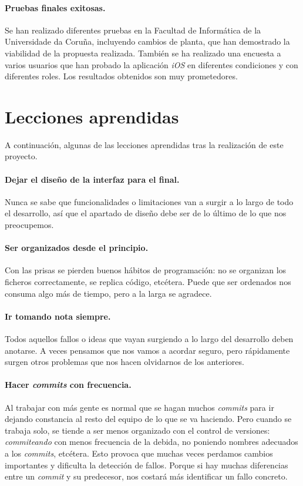 \paragraph{Pruebas finales exitosas.} Se han realizado diferentes pruebas en la Facultad de Informática de la Universidade da Coruña, incluyendo cambios de planta, que han demostrado la viabilidad de la propuesta realizada.
También se ha realizado una encuesta a varios usuarios que han probado la aplicación \emph{iOS} en diferentes condiciones y con diferentes roles. Los resultados obtenidos son muy prometedores.



\section{Lecciones aprendidas}
A continuación, algunas de las lecciones aprendidas tras la realización de este proyecto.

\paragraph{Dejar el diseño de la interfaz para el final.}
Nunca se sabe que funcionalidades o limitaciones van a surgir a lo largo de todo el desarrollo, así que el apartado de diseño debe ser de lo último de lo que nos preocupemos.

\paragraph{Ser organizados desde el principio.}
Con las prisas se pierden buenos hábitos de programación: no se organizan los ficheros correctamente, se replica código, etcétera. Puede que ser ordenados nos consuma algo más de tiempo, pero a la larga se agradece.

\paragraph{Ir tomando nota siempre.}
Todos aquellos fallos o ideas que vayan surgiendo a lo largo del desarrollo deben anotarse. A veces pensamos que nos vamos a acordar seguro, pero rápidamente surgen otros problemas que nos hacen olvidarnos de los anteriores.

\paragraph{Hacer \textit{commits} con frecuencia.}
Al trabajar con más gente es normal que se hagan muchos \textit{commits} para ir dejando constancia al resto del equipo de lo que se va haciendo. Pero cuando se trabaja solo, se tiende a ser menos organizado con el control de versiones: \textit{commiteando} con menos frecuencia de la debida, no poniendo nombres adecuados a los \textit{commits}, etcétera.
Esto provoca que muchas veces perdamos cambios importantes y dificulta la detección de fallos. Porque si hay muchas diferencias entre un \textit{commit} y su predecesor, nos costará más identificar un fallo concreto.

